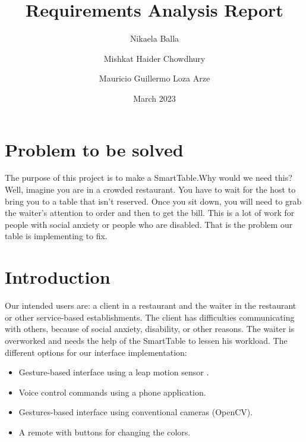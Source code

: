 \documentclass{article}
\title{Requirements Analysis Report}
\author{Nikaela Balla
\and Mishkat Haider Chowdhury
\and Mauricio Guillermo Loza Arze}
\date{March 2023}
\begin{document}
\maketitle

\section{ Problem to be solved}
\label{sec:problem}
The purpose of this project is to make a SmartTable.Why would we need this? 
Well, imagine you are in a crowded restaurant. You have to wait for the host to bring you to a table that isn't reserved. Once you sit down,
you will need to grab the waiter's attention to order and then to get the bill. This is a lot of work for people with social anxiety or people 
who are disabled. That is the problem our table is implementing to fix. 
\section{ Introduction}
Our intended users are: a client in a restaurant and the waiter in the restaurant or other service-based establishments.
The client has difficulties communicating with others, because of social anxiety, disability, or other reasons. The waiter is overworked and
needs the help of the SmartTable to lessen his workload.
The different options for our interface implementation: \begin{itemize}
    \item Gesture-based interface using a leap motion sensor \cite{zaicti2015free}.
    \item  Voice control commands using a phone application.
    \item  Gestures-based interface using conventional cameras (OpenCV).
    \item A remote with buttons for changing the colors.
\end{itemize}
\end{document}
